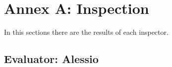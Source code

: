 
\section{Annex A: Inspection}

%
%
In this sections there are the results of each inspector.


\subsection{Evaluator: Alessio}
